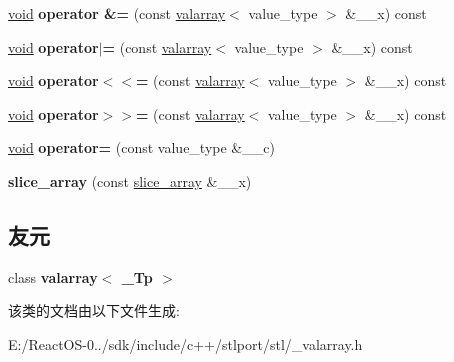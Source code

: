 \begin{DoxyCompactItemize}
\hyperlink{interfacevoid}{void} {\bfseries operator \&=} (const \hyperlink{classvalarray}{valarray}$<$ value\+\_\+type $>$ \&\+\_\+\+\_\+x) const
\item 
\mbox{\label{classslice__array_ac3eaf6260a21e408645cd705f2cf2687}} 
\hyperlink{interfacevoid}{void} {\bfseries operator$\vert$=} (const \hyperlink{classvalarray}{valarray}$<$ value\+\_\+type $>$ \&\+\_\+\+\_\+x) const
\item 
\mbox{\label{classslice__array_aa59b080b91b39f483f847951931085c0}} 
\hyperlink{interfacevoid}{void} {\bfseries operator$<$$<$=} (const \hyperlink{classvalarray}{valarray}$<$ value\+\_\+type $>$ \&\+\_\+\+\_\+x) const
\item 
\mbox{\label{classslice__array_a55f5a71f1af85ce035e5c0bed65cf4d9}} 
\hyperlink{interfacevoid}{void} {\bfseries operator$>$$>$=} (const \hyperlink{classvalarray}{valarray}$<$ value\+\_\+type $>$ \&\+\_\+\+\_\+x) const
\item 
\mbox{\label{classslice__array_a3ce903ab84a66728872d2e5edb8bfe9b}} 
\hyperlink{interfacevoid}{void} {\bfseries operator=} (const value\+\_\+type \&\+\_\+\+\_\+c)
\item 
\mbox{\label{classslice__array_a8f575f82b6fe9650247f1ff65b094676}} 
{\bfseries slice\+\_\+array} (const \hyperlink{classslice__array}{slice\+\_\+array} \&\+\_\+\+\_\+x)
\end{DoxyCompactItemize}
\subsection*{友元}
\begin{DoxyCompactItemize}
\item 
\mbox{\label{classslice__array_a0d82c6ffc3aec42e2ffa8d69cd3f0945}} 
class {\bfseries valarray$<$ \+\_\+\+Tp $>$}
\end{DoxyCompactItemize}


该类的文档由以下文件生成\+:\begin{DoxyCompactItemize}
\item 
E\+:/\+React\+O\+S-\/0../sdk/include/c++/stlport/stl/\+\_\+valarray.\+h\end{DoxyCompactItemize}
